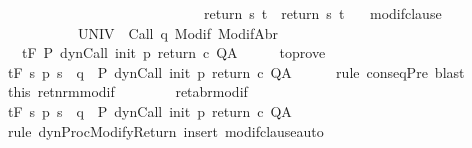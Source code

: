\begin{isabellebody}
\ \ \ \ \ \ \ \ \ \ \ \ \ \ \ \ \ \ \ \ \ \ \ \ \ \ \ \ {\isasymlongrightarrow}\ return{\isacharprime}\ s\ t\ {\isacharequal}\ return\ s\ t{\isachardoublequoteclose}\isanewline
\ \ \ modif{\isacharunderscore}clause{\isacharcolon}\ \isanewline
\ \ \ \ \ \ \ \ \ \ {\isachardoublequoteopen}{\isasymforall}{\isasymsigma}{\isachardot}\ {\isasymGamma}{\isacharcomma}{\isasymTheta}{\isasymturnstile}\isactrlbsub {\isacharslash}UNIV\isactrlesub \ {\isacharbraceleft}{\isasymsigma}{\isacharbraceright}\ {\isacharparenleft}Call\ q{\isacharparenright}\ {\isacharparenleft}Modif\ {\isasymsigma}{\isacharparenright}{\isacharcomma}{\isacharparenleft}ModifAbr\ {\isasymsigma}{\isacharparenright}{\isachardoublequoteclose}\isanewline
\ \ \ {\isachardoublequoteopen}{\isasymGamma}{\isacharcomma}{\isasymTheta}{\isasymturnstile}\isactrlsub t\isactrlbsub {\isacharslash}F\isactrlesub \ P\ {\isacharparenleft}dynCall\ init\ p\ return\ c{\isacharparenright}\ Q{\isacharcomma}A{\isachardoublequoteclose}\isanewline
%
\isadelimproof
%
\endisadelimproof
%
\isatagproof
{}\isamarkupfalse%
\ {\isacharminus}\isanewline
\ \ \isamarkupfalse%
\ to{\isacharunderscore}prove\ \isamarkupfalse%
\ {\isachardoublequoteopen}{\isasymGamma}{\isacharcomma}{\isasymTheta}{\isasymturnstile}\isactrlsub t\isactrlbsub {\isacharslash}F\isactrlesub \ {\isacharparenleft}{\isacharbraceleft}s{\isachardot}\ p\ s\ {\isacharequal}\ q{\isacharbraceright}\ {\isasyminter}\ P{\isacharprime}{\isacharparenright}\ {\isacharparenleft}dynCall\ init\ p\ return{\isacharprime}\ c{\isacharparenright}\ Q{\isacharcomma}A{\isachardoublequoteclose}\isanewline
\ \ \ \ \isamarkupfalse%
\ {\isacharparenleft}rule\ conseqPre{\isacharparenright}\ blast\isanewline
\ \ \isamarkupfalse%
\ this\ ret{\isacharunderscore}nrm{\isacharunderscore}modif\ \isanewline
\ \ \ \ \ \ \ ret{\isacharunderscore}abr{\isacharunderscore}modif\ \isanewline
\ \ \isamarkupfalse%
\ {\isachardoublequoteopen}{\isasymGamma}{\isacharcomma}{\isasymTheta}{\isasymturnstile}\isactrlsub t\isactrlbsub {\isacharslash}F\isactrlesub \ {\isacharparenleft}{\isacharbraceleft}s{\isachardot}\ p\ s\ {\isacharequal}\ q{\isacharbraceright}\ {\isasyminter}\ P{\isacharprime}{\isacharparenright}\ {\isacharparenleft}dynCall\ init\ p\ return\ c{\isacharparenright}\ Q{\isacharcomma}A{\isachardoublequoteclose}\isanewline
\ \ \ \ \isamarkupfalse%
\ {\isacharparenleft}rule\ dynProcModifyReturn{\isacharparenright}\ {\isacharparenleft}insert\ modif{\isacharunderscore}clause{\isacharcomma}auto{\isacharparenright}\isanewline

\end{isabellebody}
